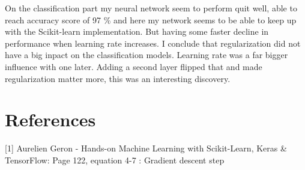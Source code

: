 \documentclass[reprint,english,notitlepage]{revtex4-2}  %
\begin{document}
On the classification part my neural network seem to perform quit well, able to reach accuracy score of 97 \% and here my network seems to be able to keep up with the Scikit-learn implementation. But having some faster decline in performance when learning rate increases. I conclude that regularization did not have a big inpact on the classification models. Learning rate was a far bigger influence with one later. Adding a second layer flipped that and made regularization matter more, this was an interesting discovery. 



\section*{References}  %
[1] Aurelien Geron - Hands-on Machine Learning with Scikit-Learn, Keras \& TensorFlow: Page 122, equation 4-7 : Gradient descent step
\end{document}
